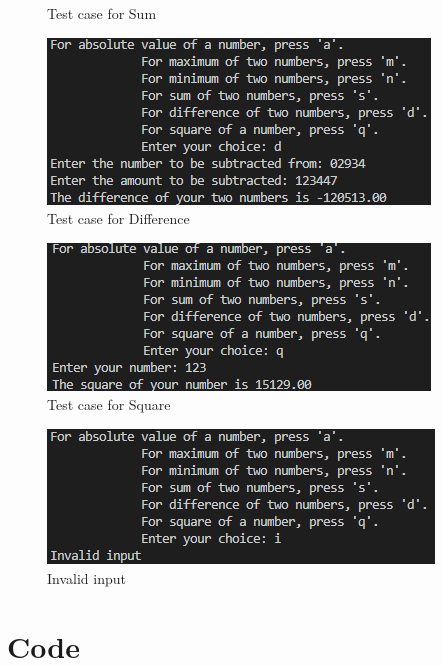 \documentclass{article}
\begin{document}
\begin{flushleft}
\begin{figure}[!h]
\begin{centering}
      \caption{Test case for Sum}
    \end{centering}
  \end{figure}
  \begin{figure}[!h]
    \begin{centering}
      \includegraphics[scale=1]{Q2_p5.png}
      \caption{Test case for Difference}
    \end{centering}
  \end{figure}
  \begin{figure}[!h]
    \begin{centering}
      \includegraphics[scale=1]{Q2_p6.png}
      \caption{Test case for Square}
    \end{centering}
  \end{figure}
  \begin{figure}[!h]
    \begin{centering}
      \includegraphics[scale=1]{Q2_p7.png}
      \caption{Invalid input}
    \end{centering}
  \end{figure}
  \newpage
  \newpage
  \section{Code}
  
\end{flushleft}
\end{document}
